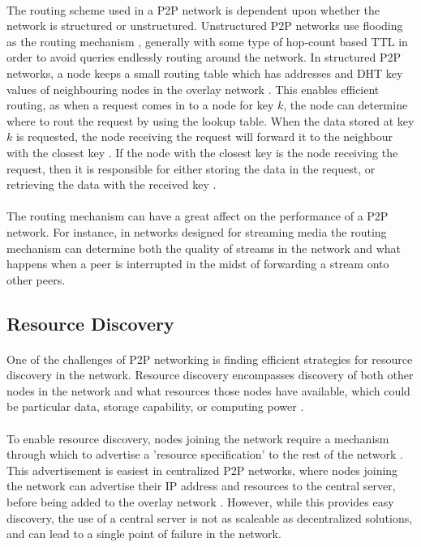 \documentclass[12pt,letterpaper]{article}
\begin{document}
\paragraph{}
The routing scheme used in a P2P network is dependent upon whether the network is structured or unstructured.
Unstructured P2P networks use flooding as the routing mechanism \cite{overlay}, generally with some type of hop-count based TTL in order to avoid queries endlessly routing around the network.
In structured P2P networks, a node keeps a small routing table which has addresses and DHT key values of neighbouring nodes in the overlay network \cite{overlay}.
This enables efficient routing, as when a request comes in to a node for key $k$, the node can determine where to rout the request by using the lookup table.
When the data stored at key $k$ is requested, the node receiving the request will forward it to the neighbour with the closest key \cite{dht}.
If the node with the closest key is the node receiving the request, then it is responsible for either storing the data in the request, or retrieving the data with the received key \cite{dht}.

\paragraph{}
The routing mechanism can have a great affect on the performance of a P2P network.
For instance, in networks designed for streaming media \cite{streaming} the routing mechanism can determine both the quality of streams in the network and what happens when a peer is interrupted in the midst of forwarding a stream onto other peers.


\subsection{Resource Discovery}
\paragraph{}
One of the challenges of P2P networking is finding efficient strategies for resource discovery in the network.
Resource discovery encompasses discovery of both other nodes in the network and what resources those nodes have available, which could be particular data, storage capability, or computing power \cite{wiki-p2p}.

\paragraph{}
To enable resource discovery, nodes joining the network require a mechanism through which to advertise a 'resource specification' to the rest of the network \cite{resource}.
This advertisement is easiest in centralized P2P networks, where nodes joining the network can advertise their IP address and resources to the central server, before being added to the overlay network \cite{resource-mobile}\cite{resource}.
However, while this provides easy discovery, the use of a central server is not as scaleable as decentralized solutions, and can lead to a single point of failure in the network.
\end{document}
